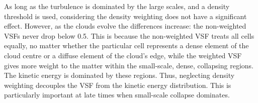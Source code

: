    As 
long as the turbulence is dominated by the large scales,
    and a density threshold is used, 
considering the density weighting does not have a significant effect.
However, as the clouds evolve the differences increase:
the non-weighted VSFs never drop below 0.5.
This is because the non-weighted VSF treats all cells equally, no matter whether the particular cell represents a dense element of the cloud centre or a diffuse element of the cloud's edge, while the weighted VSF gives more weight to the matter within the
      small-scale, dense, collapsing regions.  The kinetic energy is dominated by
      these regions.  Thus,
     neglecting density weighting decouples the VSF from the kinetic energy distribution. 
     This is particularly important at late times when small-scale collapse dominates.




